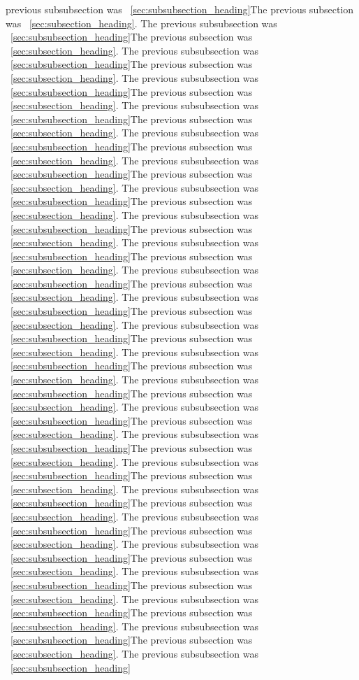 \documentclass[twocolumn,11pt,twoside]{article}
\begin{document}
previous subsubsection was ~\ref{sec:subsubsection_heading}The previous subsection was ~\ref{sec:subsection_heading}.  The
previous subsubsection was ~\ref{sec:subsubsection_heading}The previous subsection was ~\ref{sec:subsection_heading}.  The
previous subsubsection was ~\ref{sec:subsubsection_heading}The previous subsection was ~\ref{sec:subsection_heading}.  The
previous subsubsection was ~\ref{sec:subsubsection_heading}The previous subsection was ~\ref{sec:subsection_heading}.  The
previous subsubsection was ~\ref{sec:subsubsection_heading}The previous subsection was ~\ref{sec:subsection_heading}.  The
previous subsubsection was ~\ref{sec:subsubsection_heading}The previous subsection was ~\ref{sec:subsection_heading}.  The
previous subsubsection was ~\ref{sec:subsubsection_heading}The previous subsection was ~\ref{sec:subsection_heading}.  The
previous subsubsection was ~\ref{sec:subsubsection_heading}The previous subsection was ~\ref{sec:subsection_heading}.  The
previous subsubsection was ~\ref{sec:subsubsection_heading}The previous subsection was ~\ref{sec:subsection_heading}.  The
previous subsubsection was ~\ref{sec:subsubsection_heading}The previous subsection was ~\ref{sec:subsection_heading}.  The
previous subsubsection was ~\ref{sec:subsubsection_heading}The previous subsection was ~\ref{sec:subsection_heading}.  The
previous subsubsection was ~\ref{sec:subsubsection_heading}The previous subsection was ~\ref{sec:subsection_heading}.  The
previous subsubsection was ~\ref{sec:subsubsection_heading}The previous subsection was ~\ref{sec:subsection_heading}.  The
previous subsubsection was ~\ref{sec:subsubsection_heading}The previous subsection was ~\ref{sec:subsection_heading}.  The
previous subsubsection was ~\ref{sec:subsubsection_heading}The previous subsection was ~\ref{sec:subsection_heading}.  The
previous subsubsection was ~\ref{sec:subsubsection_heading}The previous subsection was ~\ref{sec:subsection_heading}.  The
previous subsubsection was ~\ref{sec:subsubsection_heading}The previous subsection was ~\ref{sec:subsection_heading}.  The
previous subsubsection was ~\ref{sec:subsubsection_heading}The previous subsection was ~\ref{sec:subsection_heading}.  The
previous subsubsection was ~\ref{sec:subsubsection_heading}The previous subsection was ~\ref{sec:subsection_heading}.  The
previous subsubsection was ~\ref{sec:subsubsection_heading}The previous subsection was ~\ref{sec:subsection_heading}.  The
previous subsubsection was ~\ref{sec:subsubsection_heading}The previous subsection was ~\ref{sec:subsection_heading}.  The
previous subsubsection was ~\ref{sec:subsubsection_heading}The previous subsection was ~\ref{sec:subsection_heading}.  The
previous subsubsection was ~\ref{sec:subsubsection_heading}The previous subsection was ~\ref{sec:subsection_heading}.  The
previous subsubsection was ~\ref{sec:subsubsection_heading}The previous subsection was ~\ref{sec:subsection_heading}.  The
previous subsubsection was ~\ref{sec:subsubsection_heading}
\end{document}
